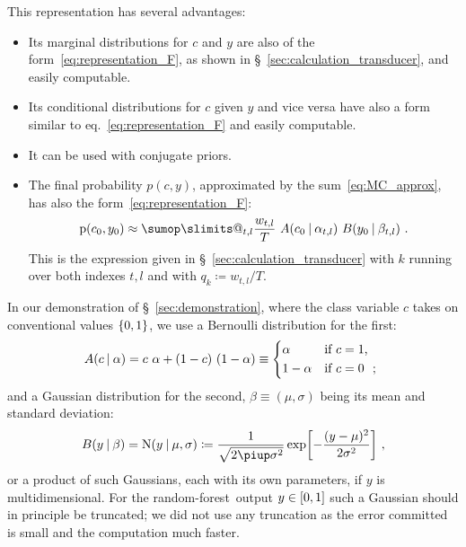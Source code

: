 \documentclass[\ifafour a4paper,12pt,\else a5paper,10pt,\fi%
onecolumn,oneside,article,%
british%
]{memoir}
\makeatletter
\theoremstyle{remark}
\theoremstyle{innote}
\def\sum{\DOTSI\sumop\slimits@}
\newcommand*{\pu}{\piup}%
\newcommand*{\defd}{\coloneqq}
\DeclarePairedDelimiter\clcl{[}{]}
\DeclarePairedDelimiter\set{\{}{\}} %
\newcommand*{\p}{\mathrm{p}}%
\renewcommand*{\|}[1][]{\nonscript\:#1\vert\nonscript\:\mathopen{}}
\newcommand*{\sect}{\S}%
\newcommand*{\eqn}{eq.}%
\newcommand*{\rf}{random-forest}
\newcommand*{\No}{\mathrm{N}}
\makeatother
\begin{document}
This representation \autocites[promoted by][]{dunsonetal2011}[see also][]{rasmussen1999} has several advantages:
\begin{itemize}
\item Its marginal distributions for $c$ and $y$ are also of the form~\eqref{eq:representation_F}, as shown in \sect~\ref{sec:calculation_transducer}, and easily computable.
\item Its conditional distributions for $c$ given $y$ and vice versa have also a form similar to \eqn~\eqref{eq:representation_F} and easily computable.
\item It can be used with conjugate priors.
\item The final probability $p(c,y)$, approximated by the sum~\eqref{eq:MC_approx}, has also the form~\eqref{eq:representation_F}:
  \begin{equation}
    \label{eq:sum_of_sums_for_prob}
    \p(c_{0}, y_{0}) \approx
    \sum_{t,l} \frac{w_{t,l}}{T}
    \ A(c_{0} \| \alpha_{t,l})\ B(y_{0} \| \beta_{t,l}) \ .
  \end{equation}
This is the expression given in \sect~\ref{sec:calculation_transducer} with $k$ running over both indexes $t,l$ and with $q_{k} \defd w_{t,l}/T$.
\end{itemize}

In our demonstration of \sect~\ref{sec:demonstration}, where the class variable $c$ takes on conventional values $\set{0,1}$, we use a Bernoulli distribution for the first:
\begin{equation}
  \label{eq:distr_class}
  A(c \| \alpha) = c\ \alpha + (1-c)\ (1-\alpha) \equiv
  \begin{dcases*}
    \alpha& if $c=1$, \\ 1-\alpha & if $c=0$ \ ;
  \end{dcases*}
\end{equation}
and a Gaussian distribution for the second, $\beta \equiv (\mu,\sigma)$ being its mean and standard deviation:
\begin{equation}
  \label{eq:distr_output}
  B(y \| \beta) = \No(y \| \mu, \sigma) \defd \frac{1}{\sqrt{2\pu\sigma^{2}}} \exp\biggl[-\frac{(y-\mu)^{2}}{2\sigma^{2}}\biggr] \ ,
\end{equation}
or a product of such Gaussians, each with its own parameters, if $y$ is multidimensional. For the \rf\ output $y\in \clcl{0,1}$ such a Gaussian should in principle be truncated; we did not use any truncation as the error committed is small and the computation much faster.
\end{document}

